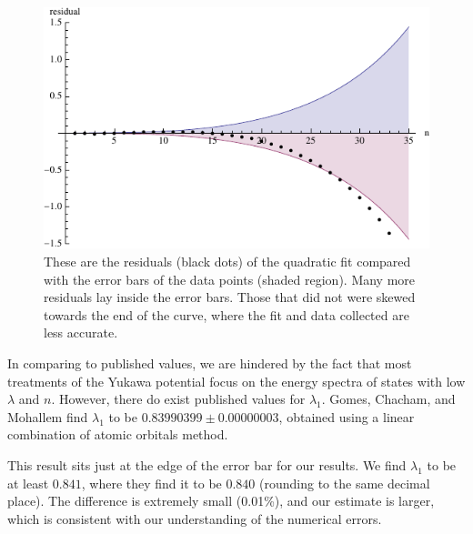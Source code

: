 \documentclass[12pt,twoside]{reedthesis}
\begin{document}
\begin{figure}[h]
\centering
\includegraphics{Figures/quaderr}
\caption[Residuals for quadratic fit]{These are the residuals (black dots) of the quadratic fit compared with the error bars of the data points (shaded region). Many more residuals lay inside the error bars. Those that did not were skewed towards the end of the curve, where the fit and data collected are less accurate.}
\label{fig:quaderr}
\end{figure}


In comparing to published values, we are hindered by the fact that most treatments of the Yukawa potential focus on the energy spectra of states with low $\lambda$ and $n$. However, there do exist published values for $\lambda_1$\cite{PhysRevA.50.228}. Gomes, Chacham, and Mohallem find  $\lambda_1$ to be $0.83990399 \pm 0.00000003$, obtained using a linear combination of atomic orbitals method. 

This result sits just at the edge of the error bar for our results. We find $\lambda_1$ to be at least $0.841$, where they find it to be $0.840$ (rounding to the same decimal place). The difference is extremely small (0.01\%), and our estimate is larger, which is consistent with our understanding of the numerical errors. 
\end{document}
